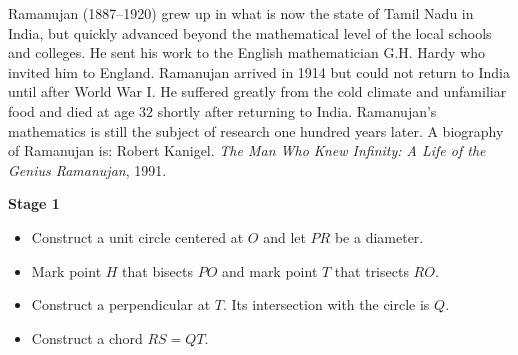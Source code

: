 Ramanujan (1887--1920) grew up in what is now the state of Tamil Nadu in India, but quickly advanced beyond the mathematical level of the local schools and colleges. He sent his work to the English mathematician G.H. Hardy who invited him to England. Ramanujan arrived in 1914 but could not return to India until after World War I. He suffered greatly from the cold climate and unfamiliar food and died at age $32$ shortly after returning to India. Ramanujan's mathematics is still the subject of research one hundred years later. A biography of Ramanujan is: Robert Kanigel. \emph{The Man Who Knew Infinity: A Life of the Genius Ramanujan}, 1991.

\newpage


\begin{center}
\textbf{\Large Stage 1}
\end{center}

\begin{itemize}
\item Construct a unit circle centered at $O$ and let $PR$ be a diameter.
\item Mark point $H$ that bisects $PO$ and mark point $T$ that trisects $RO$.
\item Construct a perpendicular at $T$. Its intersection with the circle is $Q$.
\item Construct a chord $RS=QT$.
\end{itemize}

\begin{center}
\end{center}

